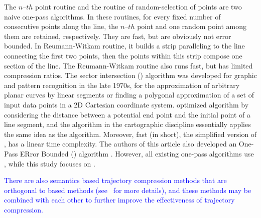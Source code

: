 The $n$--${th}$ point routine and the routine of random-selection of points \cite{Shi:Survey} are two naive one-pass algorithms.
In these routines, for every fixed number of consecutive points along the line, the $n$--${th}$  point and one random point among them are retained, respectively.
They are fast, but are obviously not error bounded.
%
In Reumann-Witkam routine\cite{Reumann:Strip}, it builds a strip paralleling to the line connecting the first two points, then the points within this strip compose one section of the line.
The Reumann-Witkam routine also runs fast, but has limited compression ratios.
%
The sector intersection (\cia) algorithm \cite{Williams:Longest, Sklansky:Cone} was developed for graphic and pattern recognition in the late 1970s, for the approximation of arbitrary planar curves by linear segments or finding a polygonal approximation of a set of input data points in a 2D Cartesian coordinate system. \cite{Dunham:Cone} optimized algorithm \cia by considering the distance between a potential end point and the initial point of a line segment, and the \sleeve algorithm \cite{Zhao:Sleeve} in the cartographic discipline essentially applies the same idea as the \cia algorithm.
%
Moreover, {fast \bqsa \cite{Liu:BQS} (\fbqsa in short), the simplified version of \bqsa, has a linear time complexity.}
%
The authors of this article also developed an One-Pass ERror Bounded (\operb) algorithm \cite{Lin:Operb}.
%
However, all existing one-pass algorithms  use \ped \cite{Williams:Longest, Sklansky:Cone, Dunham:Cone, Zhao:Sleeve,Liu:BQS,Lin:Operb}, while this study focuses on \sed.

\textcolor{blue}{
	There are also semantics based trajectory compression methods that are orthogonal to \lsa based methods (see~\cite{Zuo:Road, Han:Compress} for more details), and these methods may be combined with each other to further improve the effectiveness of trajectory compression.}


